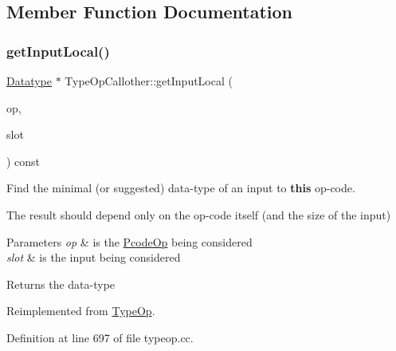 \subsection{Member Function Documentation}
\mbox{\label{class_type_op_callother_a35cf8a5ffa9af239c20c60d0e1799719}} 
\subsubsection{\texorpdfstring{getInputLocal()}{getInputLocal()}}
{\footnotesize\ttfamily \mbox{\hyperlink{class_datatype}{Datatype}} $\ast$ Type\+Op\+Callother\+::get\+Input\+Local (\begin{DoxyParamCaption}\item[{const \mbox{\hyperlink{class_pcode_op}{Pcode\+Op}} $\ast$}]{op,  }\item[{int4}]{slot }\end{DoxyParamCaption}) const\hspace{0.3cm}{\ttfamily [virtual]}}



Find the minimal (or suggested) data-\/type of an input to {\bfseries{this}} op-\/code. 

The result should depend only on the op-\/code itself (and the size of the input) 
\begin{DoxyParams}{Parameters}
{\em op} & is the \mbox{\hyperlink{class_pcode_op}{Pcode\+Op}} being considered \\
\hline
{\em slot} & is the input being considered \\
\hline
\end{DoxyParams}
\begin{DoxyReturn}{Returns}
the data-\/type 
\end{DoxyReturn}


Reimplemented from \mbox{\hyperlink{class_type_op_abe2e4b619932cf94bafb084963a0fc66}{Type\+Op}}.



Definition at line 697 of file typeop.\+cc.

